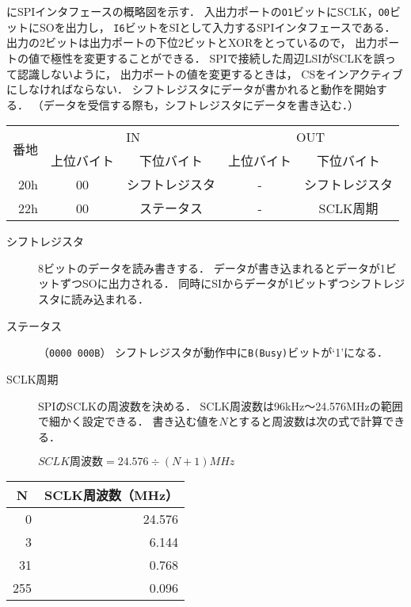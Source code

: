 にSPIインタフェースの概略図を示す．
入出力ポートの\texttt{O1}ビットにSCLK，\texttt{O0}ビットにSOを出力し，
\texttt{I6}ビットをSIとして入力するSPIインタフェースである．
出力の2ビットは出力ポートの下位2ビットとXORをとっているので，
出力ポートの値で極性を変更することができる．
SPIで接続した周辺LSIがSCLKを誤って認識しないように，
出力ポートの値を変更するときは，
CSをインアクティブにしなければならない．
シフトレジスタにデータが書かれると動作を開始する．
（データを受信する際も，シフトレジスタにデータを書き込む．）


\begin{center}
  \small\begin{tabular}{| r | c | c || c | c |}\hline
    \multirow{2}{*}{番地}
    & \multicolumn{2}{|c||}{IN}
    & \multicolumn{2}{c|}{OUT}
    \\\cline{2-5}
         & 上位バイト & 下位バイト & 上位バイト & 下位バイト
    \\\hline\hline
    20h  &  00 & シフトレジスタ
         &  -  & シフトレジスタ \\\hline
    22h  &  00 & ステータス
         &  -  & SCLK周期       \\\hline
  \end{tabular}
\end{center}

\begin{description}
\item[シフトレジスタ]
  8ビットのデータを読み書きする．
  データが書き込まれるとデータが1ビットずつSOに出力される．
  同時にSIからデータが1ビットずつシフトレジスタに読み込まれる．
\item[ステータス]（\texttt{0000 000B}）
  シフトレジスタが動作中に\texttt{B(Busy)}ビットが`1'になる．
\item[SCLK周期]
  SPIのSCLKの周波数を決める．
  SCLK周波数は96kHz〜24.576MHzの範囲で細かく設定できる．
  書き込む値を$N$とすると周波数は次の式で計算できる．

  \centerline{$SCLK周波数 = 24.576 \div ( N + 1 ) MHz$}
\end{description}

\begin{center}
  \small\begin{tabular}{ r | r }\hline\hline
  \multicolumn{1}{c|}{N} & \multicolumn{1}{|c}{SCLK周波数（MHz）} \\\hline
  0   & 24.576 \\
  3   &  6.144 \\
  31  &  0.768 \\
  255 &  0.096 \\
  \end{tabular}
\end{center}

